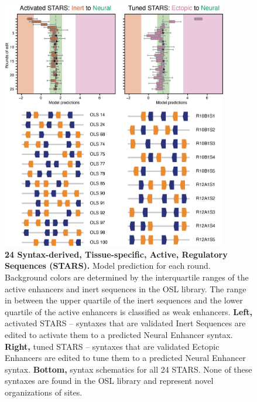\begin{figure}[p]
    \centering
    \includegraphics[width=0.88\textwidth]{2_figures-and-files/SuppFig11.png}
    \caption[24 Syntax-derived, Tissue-specific, Active, Regulatory Sequences (STARS).]{\textbf{24 Syntax-derived, Tissue-specific, Active, Regulatory Sequences (STARS).} Model prediction for each round. Background colors are determined by the interquartile ranges of the active enhancers and inert sequences in the OSL library. The range in between the upper quartile of the inert sequences and the lower quartile of the active enhancers is classified as weak enhancers. \textbf{Left,} activated STARS – syntaxes that are validated Inert Sequences are edited to activate them to a predicted Neural Enhancer syntax. \textbf{Right,} tuned STARS – syntaxes that are validated Ectopic Enhancers are edited to tune them to a predicted Neural Enhancer syntax. \textbf{Bottom,} syntax schematics for all 24 STARS. None of these syntaxes are found in the OSL library and represent novel organizations of sites.}
    \label{fig:supplementary_11}
\end{figure}

